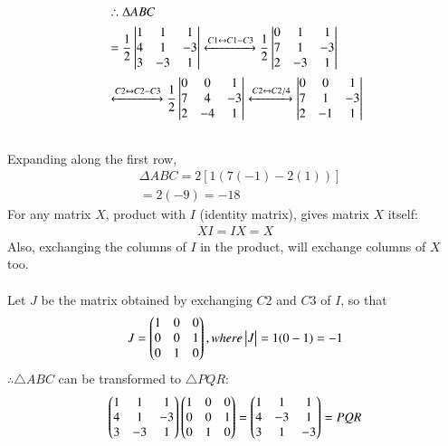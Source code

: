 \documentclass[journal,12pt,twocolumn]{IEEEtran}
\renewcommand\thesection{\arabic{section}}
\begin{document}
\begin{enumerate}[label=\thesection.\arabic*.,ref=\thesection.\theenumi]
\begin{equation}
\begin{split}
&\therefore\Delta ABC \\&=\frac{1}{2}\begin{vmatrix}1 & 1 & 1\\ 4 & 1 & -3\\ 3 & -3& 1\end{vmatrix}
\xleftrightarrow[]{C1\leftrightarrow C1-C3}\frac{1}{2}\begin{vmatrix}0 & 1 & 1\\ 7 & 1 & -3\\ 2 & -3 & 1\end{vmatrix}\\
&\xleftrightarrow[]{C2\leftrightarrow C2-C3}\frac{1}{2}\begin{vmatrix}0 & 0 & 1\\ 7 & 4 & -3\\ 2 & -4 & 1\end{vmatrix}
\xleftrightarrow[]{C2\leftrightarrow C2/4}\begin{vmatrix}0 & 0 & 1\\7 & 1 & -3\\2 & -1 & 1\end{vmatrix}\\\\
\end{split}
\end{equation}
Expanding along the first row,
\begin{equation}\label{eq:area_abc}
\begin{split}
&\Delta ABC=2\left [ 1(7(-1)-2(1)) \right ]\\&=2\left ( -9 \right )=-18
\end{split}
\end{equation}
For any matrix $X$, product with $I$ (identity matrix), gives matrix $X$ itself:
\begin{align}
    XI=IX=X
\end{align}
Also, exchanging the columns of $I$ in the product, will exchange columns of $X$ too.\\\\
Let $J$ be the matrix obtained by exchanging $C2$ and $C3$ of $I$, so that
\begin{align}
\label{eq:det of J}
J=\begin{pmatrix}1 & 0 & 0\\0 & 0 & 1\\ 0 & 1 & 0\end{pmatrix} , where \begin{vmatrix}J\end{vmatrix} =1(0-1)=-1
\end{align}
$\therefore\triangle ABC$ can be transformed to $\triangle PQR$:
\begin{align}
\myvec{1 & 1 & 1 \\ 4 & 1 & -3\\ 3 & -3 & 1}
\myvec{1 & 0 & 0\\ 0 & 0 & 1\\0 & 1 & 0}=
\myvec{1 & 1 & 1\\4 & -3 & 1\\ 3 & 1 & -3}=PQR

\end{align}
\end{enumerate}
\end{document}
